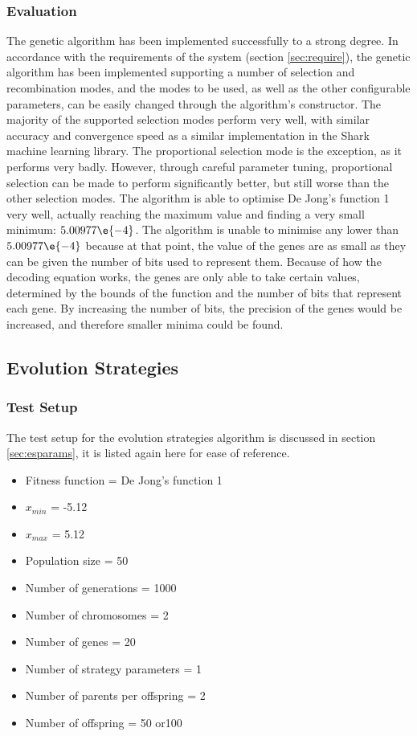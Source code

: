 \subsubsection{Evaluation}
The genetic algorithm has been implemented successfully to a strong degree. In accordance with the requirements of the system (section \ref{sec:require}), the genetic algorithm has been implemented supporting a number of selection and recombination modes, and the modes to be used, as well as the other configurable parameters, can be easily changed through the algorithm's constructor. The majority of the supported selection modes perform very well, with similar accuracy and convergence speed as a similar implementation in the Shark machine learning library. The proportional selection mode is the exception, as it performs very badly. However, through careful parameter tuning, proportional selection can be made to perform significantly better, but still worse than the other selection modes. The algorithm is able to optimise De Jong's function 1 very well, actually reaching the maximum value and finding a very small minimum: $5.00977\e{-4}$. The algorithm is unable to minimise any lower than $5.00977\e{-4}$ because at that point, the value of the genes are as small as they can be given the number of bits used to represent them. Because of how the decoding equation works, the genes are only able to take certain values, determined by the bounds of the function and the number of bits that represent each gene. By increasing the number of bits, the precision of the genes would be increased, and therefore smaller minima could be found.

\subsection{Evolution Strategies}

\subsubsection{Test Setup}
The test setup for the evolution strategies algorithm is discussed in section \ref{sec:esparams}, it is listed again here for ease of reference.
\begin{itemize}
  \item{Fitness function = De Jong's function 1}
  \item{$x_{min}$ = -5.12}
  \item{$x_{max}$ = 5.12}
  \item{Population size = 50}
  \item{Number of generations = 1000}
  \item{Number of chromosomes = 2}
  \item{Number of genes = 20}
  \item{Number of strategy parameters = 1}
  \item{Number of parents per offspring = 2}
  \item{Number of offspring = 50 or100}
\end{itemize}


